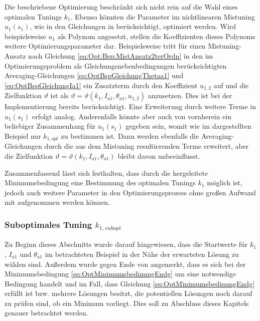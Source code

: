 Die beschriebene Optimierung beschränkt sich nicht rein auf die Wahl eines optimalen Tunings $k_1$. 
Ebenso könnten die Parameter im nichtlinearen Mistuning $u_1(s_1)$, wie in den Gleichungen in   berücksichtigt, optimiert werden.
Wird beispielsweise $u_1$ als Polynom angesetzt, stellen die Koeffizienten dieses Polynoms weitere Optimierungsparameter dar. 
Beispielsweise tritt für einen Mistuning-Ansatz nach Gleichung 	\eqref{eq:Opt:Bsp:MistAnsatz2terOrdn} in den im 
Optimierungsproblem als Gleichungsnebenbedingungen berücksichtigten Averaging-Gleichungen 	\eqref{eq:OptBspGleichungThetaa1} und \eqref{eq:OptBspGleichungIa1} ein Zusatzterm
durch den Koeffizient $u_{1,2}$ auf und die Zielfunktion $\vartheta$ ist als $\vartheta = \vartheta(k_1,I_{a1},\theta_{a1}, u_{1,2}) $ anzusetzen.
Dies ist bei der Implementierung bereits berücksichtigt.
Eine Erweiterung durch weitere Terme in $u_1(s_1)$ erfolgt analog.
Anderenfalls könnte aber auch von vornherein ein beliebiger Zusammenhang für $u_1(s_1)$ gegeben sein,   
womit wie im dargestellten Beispiel nur $k_{1,opt}$ zu bestimmen ist.  
Dann werden ebenfalls die Averaging-Gleichungen durch die aus dem Mistuning 
resultierenden Terme erweitert, aber die Zielfunktion $\vartheta = \vartheta(k_1,I_{a1},\theta_{a1})$ 
bleibt davon unbeeinflusst.




Zusammenfassend lässt sich festhalten, dass durch die hergeleitete Minimumsbedingung eine Bestimmung des optimalen Tunings $k_1$ möglich ist, jedoch
auch weitere Parameter in den Optimierungsprozess ohne großen Aufwand mit aufgenommen werden können. 









%
%
%
\subsubsection{Suboptimales Tuning \texorpdfstring{$k_{1,subopt}$}{k1subopt} }

Zu Beginn dieses Abschnitts wurde darauf hingewiesen, dass die Startwerte für $k_1$, $I_{a1}$ und $\theta_{a1}$ im betrachteten Beispiel in der Nähe der erwarteten Lösung zu wählen sind. 
Außerdem wurde gegen Ende von  angemerkt, dass es sich bei der Minimumsbedingung \eqref{eq:OptMinimumsbedinungEndg} 
um eine notwendige Bedingung handelt und im Fall, dass Gleichung	\eqref{eq:OptMinimumsbedinungEndg} erfüllt ist bzw.  mehrere Lösungen besitzt, 
die potentiellen Lösungen noch darauf zu prüfen sind, ob ein Minimum vorliegt.
Dies soll zu Abschluss dieses Kapitels genauer betrachtet werden.

